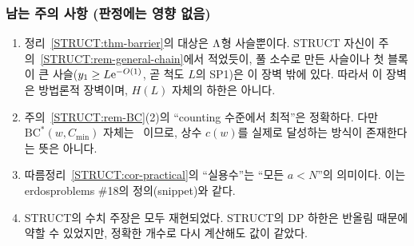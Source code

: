 \subsubsection{남는 주의 사항 (판정에는 영향 없음)}
\label{AUD2:remarks}
\begin{enumerate}[label=(R\arabic*)]
\item 정리~\ref{STRUCT:thm-barrier}의 대상은 $\Lambda$형 사슬뿐이다. STRUCT 자신이 주의~\ref{STRUCT:rem-general-chain}에서 적었듯이, 풀 소수로 만든 사슬이나 첫 블록이 큰 사슬($y_1\ge L\mathrm{e}^{-O(1)}$, 곧 척도 $L$의 SP1)은 이 장벽 밖에 있다. 따라서 이 장벽은 방법론적 장벽이며, $H(L)$ 자체의 하한은 아니다.
\item 주의~\ref{STRUCT:rem-BC}(2)의 ``counting 수준에서 최적''은 정확하다. 다만 $\mathrm{BC}^*(w,C_{\min})$ 자체는 \OPEN\ 이므로, 상수 $c(w)$를 실제로 달성하는 방식이 존재한다는 뜻은 아니다.
\item 따름정리~\ref{STRUCT:cor-practical}의 ``실용수''는 ``모든 $a<N$''의 의미이다. 이는 erdosproblems \#18의 정의(snippet)와 같다.
\item STRUCT의 수치 주장은 모두 재현되었다. STRUCT의 DP 하한은 반올림 때문에 약할 수 있었지만, 정확한 개수로 다시 계산해도 값이 같았다.
\end{enumerate}
